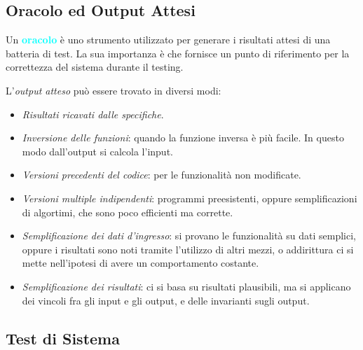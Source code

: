 \subsection{Oracolo ed Output Attesi}

\begin{definition}[Oracolo]
    Un \textbf{\textcolor{cyan}{oracolo}} è uno strumento utilizzato per generare
    i risultati attesi di una batteria di test. La sua importanza è che fornisce
    un punto di riferimento per la correttezza del sistema durante il testing.
\end{definition}

L'\emph{output atteso} può essere trovato in diversi modi:
\begin{itemize}
    \item \emph{Risultati ricavati dalle specifiche}.
    \item \emph{Inversione delle funzioni}: quando la funzione inversa è più facile. In questo modo
        dall'output si calcola l'input.
    \item \emph{Versioni precedenti del codice}: per le funzionalità non modificate.
    \item \emph{Versioni multiple indipendenti}: programmi preesistenti, oppure semplificazioni
        di algortimi, che sono poco efficienti ma corrette.
    \item \emph{Semplificazione dei dati d'ingresso}: si provano le funzionalità su dati semplici,
        oppure i risultati sono noti tramite l'utilizzo di altri mezzi, o addirittura ci si mette
        nell'ipotesi di avere un comportamento costante.
    \item \emph{Semplificazione dei risultati}: ci si basa su risultati plausibili,
        ma si applicano dei vincoli fra gli input e gli output, e delle invarianti
        sugli output.
\end{itemize}

\subsection{Test di Sistema}

